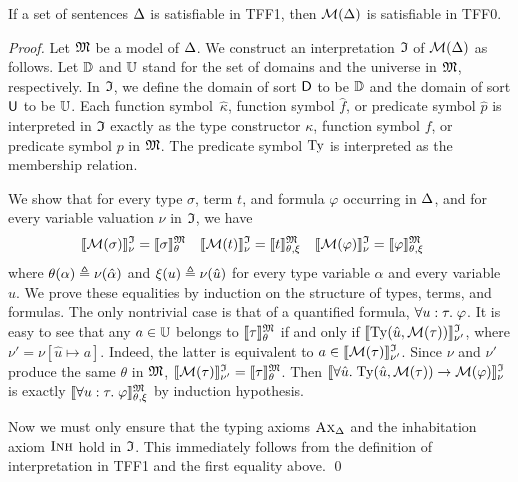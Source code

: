 \begin{theorem}%
\label{thm:mon_sound}%
\afterDot
If a set of sentences $\mathrm{\Delta}$ is satisfiable in TFF1,
then $\mathcal{M}(\mathrm{\Delta})$ is satisfiable in TFF0.
\end{theorem}
\begin{proof}
Let $\mathfrak{M}$ be a model of $\mathrm{\Delta}$.
We construct an interpretation $\mathfrak{I}$ of $\mathcal{M}(\mathrm{\Delta})$ as follows.
Let $\mathbb{D}$ and $\mathbb{U}$ stand for
the set of domains and the universe in $\mathfrak{M}$, respectively.
In $\mathfrak{I}$, we define the domain of sort $\mathsf{D}$ to be $\mathbb{D}$
and the domain of sort $\mathsf{U}$ to be $\mathbb{U}$.
Each function symbol~$\hat{\kappa}$, function symbol $\hat{f}$,
or predicate symbol $\hat{p}$ is interpreted in $\mathfrak{I}$
exactly as the type constructor $\kappa$, function symbol $f$,
or predicate symbol $p$ in $\mathfrak{M}$.
The predicate symbol $\mathrm{Ty}$ is interpreted as the membership relation.

We show that for every type $\sigma$, term $t$,
and formula $\varphi$ occurring in $\mathrm{\Delta}$, and
for every variable valuation $\nu$ in $\mathfrak{I}$, we have
\begin{align*}
\llbracket \mathcal{M}(\sigma) \rrbracket^{\mathfrak{I}}_{\nu} &= \llbracket \sigma \rrbracket^{\mathfrak{M}}_{\theta} &
\llbracket \mathcal{M}(t) \rrbracket^{\mathfrak{I}}_{\nu} &= \llbracket t \rrbracket^{\mathfrak{M}}_{\theta,\xi} &
\llbracket \mathcal{M}(\varphi) \rrbracket^{\mathfrak{I}}_{\nu} &= \llbracket \varphi \rrbracket^{\mathfrak{M}}_{\theta,\xi}
\end{align*}
where $\theta(\alpha) \mathrel{\triangleq} \nu(\hat{\alpha})$ and
$\xi(u) \mathrel{\triangleq} \nu(\hat{u})$ for every
type variable $\alpha$ and every variable $u$.
%
We prove these equalities by induction on the structure
of types, terms, and formulas. The only nontrivial case is
that of a quantified formula, $\forall u \mathrel{:} \tau .\; \varphi$.
It is easy to see that any $a \in \mathbb{U}$ belongs
to $\llbracket \tau \rrbracket^{\mathfrak{M}}_\theta$ if and only if
$\llbracket \mathrm{Ty}(\hat{u},\mathcal{M}(\tau)) \rrbracket^{\mathfrak{I}}_{\nu'}$,
where $\nu' = \nu[\hat{u} \mapsto a]$.
Indeed, the latter is equivalent to
$a \in \llbracket \mathcal{M}(\tau) \rrbracket^{\mathfrak{I}}_{\nu'}$.
Since $\nu$ and $\nu'$ produce the same
$\theta$ in $\mathfrak{M}$,
$\llbracket \mathcal{M}(\tau) \rrbracket^{\mathfrak{I}}_{\nu'} = \llbracket \tau \rrbracket^{\mathfrak{M}}_\theta$.
Then
$\llbracket \forall \hat{u} .\; \mathrm{Ty}(\hat{u},\mathcal{M}(\tau))
\rightarrow \mathcal{M}(\varphi) \rrbracket^{\mathfrak{I}}_{\nu}$ is exactly
$\llbracket \forall u \mathrel{:} \tau .\; \varphi \rrbracket^{\mathfrak{M}}_{\theta,\xi}$
by induction hypothesis.

Now we must only ensure that the typing axioms
$\text{\sc Ax}_{\mathrm{\Delta}}$ and the inhabitation axiom $\text{\sc Inh}$ hold in $\mathfrak{I}$.
This immediately follows from the definition of
interpretation in TFF1 and the first equality above.
\qed
\end{proof}

